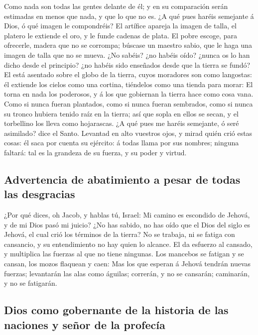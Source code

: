  Como nada son todas las gentes delante de él; y en su
comparación serán estimadas en menos que nada, y que lo que no es.
 ¿A qué pues haréis semejante á Dios, ó qué imagen le
compondréis?  El artífice apareja la imagen de talla, el
platero le extiende el oro, y le funde cadenas de plata. 
El pobre escoge, para ofrecerle, madera que no se corrompa; búscase un
maestro sabio, que le haga una imagen de talla que no se mueva.
 ¿No sabéis? ¿no habéis oído? ¿nunca os lo han dicho
desde el principio? ¿no habéis sido enseñados desde que la tierra se
fundó?  El está asentado sobre el globo de la tierra,
cuyos moradores son como langostas: él extiende los cielos como una
cortina, tiéndelos como una tienda para morar:  El torna
en nada los poderosos, y á los que gobiernan la tierra hace como cosa
vana.  Como si nunca fueran plantados, como si nunca
fueran sembrados, como si nunca su tronco hubiera tenido raíz en la
tierra; así que sopla en ellos se secan, y el torbellino los lleva como
hojarascas.  ¿A qué pues me haréis semejante, ó seré
asimilado? dice el Santo.  Levantad en alto vuestros
ojos, y mirad quién crió estas cosas: él saca por cuenta su ejército: á
todas llama por sus nombres; ninguna faltará: tal es la grandeza de su
fuerza, y su poder y virtud.

\hypertarget{advertencia-de-abatimiento-a-pesar-de-todas-las-desgracias}{%
\subsection{Advertencia de abatimiento a pesar de todas las
desgracias}\label{advertencia-de-abatimiento-a-pesar-de-todas-las-desgracias}}

 ¿Por qué dices, oh Jacob, y hablas tú, Israel: Mi camino
es escondido de Jehová, y de mi Dios pasó mi juicio?  ¿No
has sabido, no has oído que el Dios del siglo es Jehová, el cual crió
los términos de la tierra? No se trabaja, ni se fatiga con cansancio, y
su entendimiento no hay quien lo alcance.  El da esfuerzo
al cansado, y multiplica las fuerzas al que no tiene ningunas.
 Los mancebos se fatigan y se cansan, los mozos flaquean
y caen:  Mas los que esperan á Jehová tendrán nuevas
fuerzas; levantarán las alas como águilas; correrán, y no se cansarán;
caminarán, y no se fatigarán.

\hypertarget{dios-como-gobernante-de-la-historia-de-las-naciones-y-seuxf1or-de-la-profecuxeda}{%
\subsection{Dios como gobernante de la historia de las naciones y señor
de la
profecía}\label{dios-como-gobernante-de-la-historia-de-las-naciones-y-seuxf1or-de-la-profecuxeda}}

